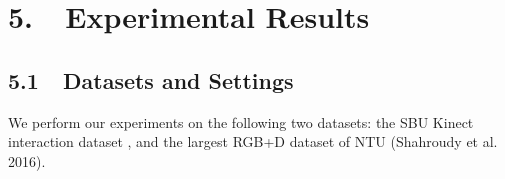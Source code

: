 \documentclass[letterpaper]{article}
\begin{document}
\begin{comment}
We integrate spatial and temporal attention in the same network, which is able to pay different attention to each joint and assign different importance levels to each frame as the action proceeds. Due to the normalized spatial attention through softmax function, it is possible for the network to ignore some joints though they also contain dominant features. Taking the various length of the video sequence into account, to encourage the network pay equal attention to every joint \cite{xu2015show,Ramanathan2015action}, we introduce an additional constraint which can be given by:
\begin{equation}
\label{equ:spa_constraint}
\frac{\sum_{t=1}^T \alpha_{t,i}}{T} \approx 1.
\end{equation}
This attention penalty can force the model to attend every joint at some point during as the time flows. Finally, we formulate the objective function of the spatial-temporal attention network with a regularised cross-entropy loss as follows:
\begin{equation}
\label{equ:lossfuntion}
L = -\sum_{i=1}^C y_i\log \hat{y}_i + \lambda \sum_{i=1}^K \left( 1 - \frac{\sum_{t=1}^T \alpha_{t,i}}{T} \right)^2 + \gamma \| \bm{W}_{\alpha \beta}\|_1,
\end{equation}
where $\bm{y}$ is the one hot label vector, $\hat{y_i}$ is the probability that the whole video is labelled as the $i_{th}$ class, $\lambda$ is a scalar to balance the contribution of the regularization term, and $\gamma$ is the weight decay coefficient. Besides, $\bm{W}_{\alpha \beta}$ denotes connection matrix in the model.

The LSTM network in Fig.\ref{fig:network} is hard to train because of the huge parameter space. Thus, we train the network iteratively to simplify the training process. Spatial attention weights are first set to 1 to every joint and only temporal attention weights are learned. Then we fix the temporal
attention weights and optimize the parameters in the model of spatial attention. Our LSTM network can be optimized to its best performance after several iterations.
\end{comment}


\section{5.~~Experimental Results}
\subsection{5.1~~Datasets and Settings}
We perform our experiments on the following two datasets: the SBU Kinect interaction dataset \cite{yun2012two}, and the largest RGB+D dataset of NTU (Shahroudy et al. 2016).
\end{document}
